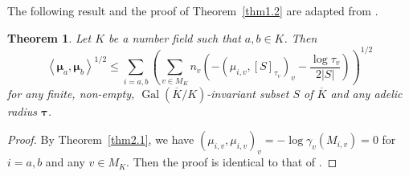 \documentclass[11pt]{amsart}
\numberwithin{equation}{section}
\theoremstyle{plain}
\newtheorem{thm}{Theorem}[section]
\theoremstyle{definition}
\theoremstyle{remark}
\DeclareMathOperator{\Gal}{Gal}
\renewcommand{\bar}{\overline}
\begin{document}
The following result and the proof of Theorem~\ref{thm1.2} are adapted
from \cite[Section 9]{DKY2}.

\begin{thm}\label{thm3.13}
Let $K$ be a number field such that $a,b\in K$.
Then
\[
\left\langle \boldsymbol{\mu}_{a},\boldsymbol{\mu}_{b}\right\rangle ^{1/2}\leq\sum_{i=a,b}\left(\sum_{v\in M_{K}}n_{v}\left(-(\mu_{i,v},[S]_{\tau_{v}})_{v}-\frac{\log\tau_{v}}{2|S|}\right)\right)^{1/2}
\]
for any finite, non-empty, $\Gal(\bar{K}/K)$-invariant subset
$S$ of $\bar{K}$ and any adelic radius $\boldsymbol{\tau}$.
\end{thm}

\begin{proof}
By Theorem~\ref{thm2.1}, we have $(\mu_{i,v},\mu_{i,v})_{v}=-\log\gamma_{v}(M_{i,v})=0$
for $i=a,b$ and any $v\in M_{K}$. Then the proof is identical to
that of \cite[Lemma 9.2]{DKY2}.
\end{proof}
\end{document}
